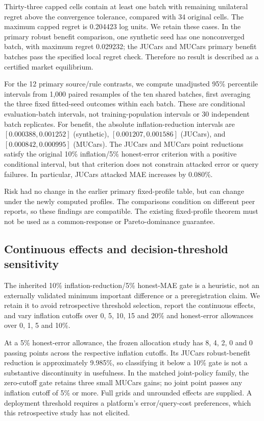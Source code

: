 \documentclass[11pt]{article}
\begin{document}
Thirty-three capped cells contain at least one batch with remaining unilateral
regret above the convergence tolerance, compared with 34 original cells. The
maximum capped regret is 0.204423 log units. We retain these cases. In the primary
robust benefit comparison, one synthetic seed has one nonconverged batch, with
maximum regret 0.029232; the JUCars and MUCars primary benefit batches pass the
specified local regret check. Therefore no result is described as a certified
market equilibrium.

For the 12 primary source/rule contrasts, we compute unadjusted 95\% percentile
intervals from 1,000 paired resamples of the ten shared batches, first averaging
the three fixed fitted-seed outcomes within each batch. These are conditional
evaluation-batch intervals, not training-population intervals or 30 independent
batch replicates. For benefit, the absolute inflation-reduction intervals are
$[0.000388,0.001252]$ (synthetic), $[0.001207,0.001586]$ (JUCars), and
$[0.000842,0.000995]$ (MUCars). The JUCars and MUCars point reductions satisfy
the original 10\% inflation/5\% honest-error criterion with a positive conditional
interval, but that criterion does not constrain attacked error or query failures.
In particular, JUCars attacked MAE increases by 0.080\%.

Risk had no change in the earlier primary fixed-profile table, but can change
under the newly computed profiles. The comparisons condition on different peer
reports, so these findings are compatible. The existing fixed-profile theorem
must not be used as a common-response or Pareto-dominance guarantee.

\subsection{Continuous effects and decision-threshold sensitivity}
The inherited 10\% inflation-reduction/5\% honest-MAE gate is a heuristic,
not an externally validated minimum important difference or a preregistration
claim. We retain it to avoid retrospective threshold selection, report the
continuous effects, and vary inflation cutoffs over 0, 5, 10, 15 and 20\%
and honest-error allowances over 0, 1, 5 and 10\%.

At a 5\% honest-error allowance, the frozen allocation study has 8, 4, 2, 0
and 0 passing points across the respective inflation cutoffs. Its JUCars
robust-benefit reduction is approximately 9.985\%, so classifying it below a
10\% gate is not a substantive discontinuity in usefulness. In the matched
joint-policy family, the zero-cutoff gate retains three small MUCars gains;
no joint point passes any inflation cutoff of 5\% or more. Full grids and
unrounded effects are supplied. A deployment threshold requires a platform's
error/query-cost preferences, which this retrospective study has not elicited.
\end{document}
